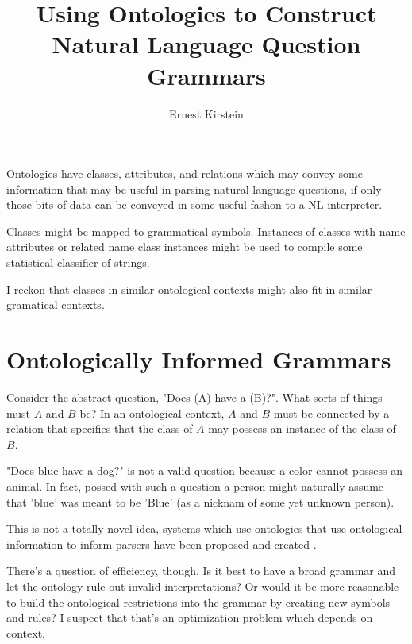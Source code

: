 \documentclass[11pt]{article}
\begin{document}
\title{Using Ontologies to Construct Natural Language Question Grammars}
\author{Ernest Kirstein}
\maketitle

Ontologies have classes, attributes, and relations which may convey some information
that may be useful in parsing natural language questions, if only those bits of data
can be conveyed in some useful fashon to a NL interpreter.

Classes might be mapped to grammatical symbols. Instances of classes with name
attributes or related name class instances might be used to compile some
statistical classifier of strings.

I reckon that classes in similar ontological contexts might also fit in similar gramatical contexts.

\section*{Ontologically Informed Grammars}

Consider the abstract question, "Does (A) have a (B)?".
What sorts of things must $A$ and $B$ be? 
In an ontological context, $A$ and $B$ must be connected by a relation
that specifies that the class of $A$ may possess an instance of the class of $B$.

"Does blue have a dog?" is not a valid question because a color cannot possess
an animal. In fact, possed with such a question a person might naturally assume
that 'blue' was meant to be 'Blue' (as a nicknam of some yet unknown person).

This is not a totally novel idea, systems which use ontologies that use
ontological information to inform parsers have been proposed and created \cite{ontgram}.

There's a question of efficiency, though. Is it best to have a broad grammar
and let the ontology rule out invalid interpretations?
Or would it be more reasonable to build the ontological restrictions into the grammar
by creating new symbols and rules? I suspect that that's an optimization problem
which depends on context.

{}

\end{document}
